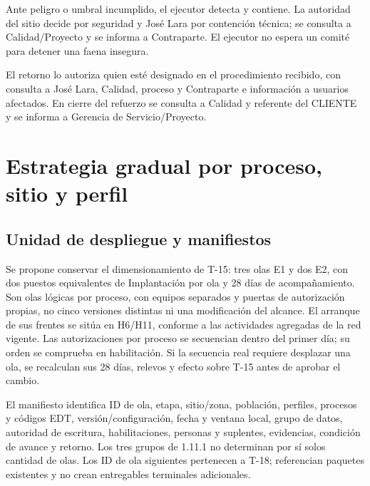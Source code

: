 Ante peligro o umbral incumplido, el ejecutor detecta y contiene. La autoridad del sitio decide por seguridad y José Lara por contención técnica; se consulta a Calidad/Proyecto y se informa a Contraparte. El ejecutor no espera un comité para detener una faena insegura.

El retorno lo autoriza quien esté designado en el procedimiento recibido, con consulta a José Lara, Calidad, proceso y Contraparte e información a usuarios afectados. En cierre del refuerzo se consulta a Calidad y referente del CLIENTE y se informa a Gerencia de Servicio/Proyecto.


\section{Estrategia gradual por proceso, sitio y perfil}\label{sec:t18-estrategia}
\subsection{Unidad de despliegue y manifiestos}
Se propone conservar el dimensionamiento de T-15: tres olas E1 y dos E2, con dos puestos equivalentes de Implantación por ola y 28 días de acompañamiento. Son olas lógicas por proceso, con equipos separados y puertas de autorización propias, no cinco versiones distintas ni una modificación del alcance. El arranque de sus frentes se sitúa en H6/H11, conforme a las actividades agregadas de la red vigente. Las autorizaciones por proceso se secuencian dentro del primer día; su orden se comprueba en habilitación. Si la secuencia real requiere desplazar una ola, se recalculan sus 28 días, relevos y efecto sobre T-15 antes de aprobar el cambio.

El manifiesto identifica ID de ola, etapa, sitio/zona, población, perfiles, procesos y códigos EDT, versión/configuración, fecha y ventana local, grupo de datos, autoridad de escritura, habilitaciones, personas y suplentes, evidencias, condición de avance y retorno. Los tres grupos de 1.11.1 no determinan por sí solos cantidad de olas. Los ID de ola siguientes pertenecen a T-18; referencian paquetes existentes y no crean entregables terminales adicionales.


